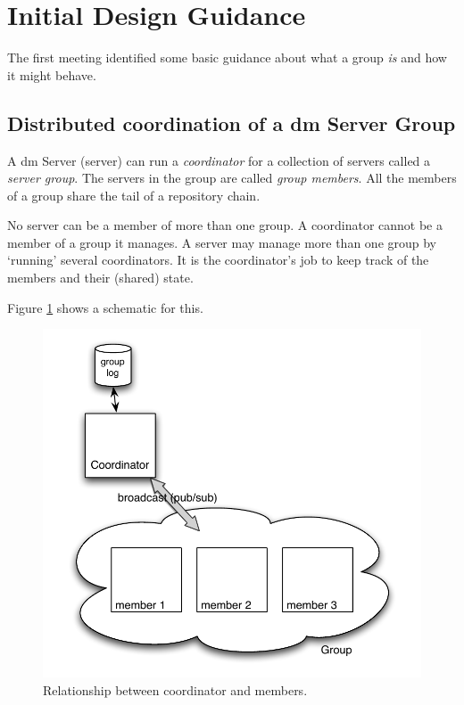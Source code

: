 \documentclass[a4paper,12pt]{article}
\begin{document}
    

\clearpage

\section{Initial Design Guidance}
The first meeting identified some basic guidance about what a group \emph{is} and how it might behave.


\subsection{Distributed coordination of a dm Server Group}
A dm Server (server) can run a \emph{coordinator} for a collection of servers called a \emph{server group}. The servers in the group are called \emph{group members}. All the members of a group share the tail of a repository chain.

No server can be a member of more than one group. A coordinator cannot be a member of a group it manages. A server may manage more than one group by `running' several coordinators. It is the coordinator's job to keep track of the members and their (shared) state.

Figure \ref{fig:earlydist} shows a schematic for this.
\begin{figure}[h]
\centering
\includegraphics*[scale=0.7]{EarlyDist.pdf}
\caption{Relationship between coordinator and members.}
\label{fig:earlydist}
\end{figure}
\end{document}
